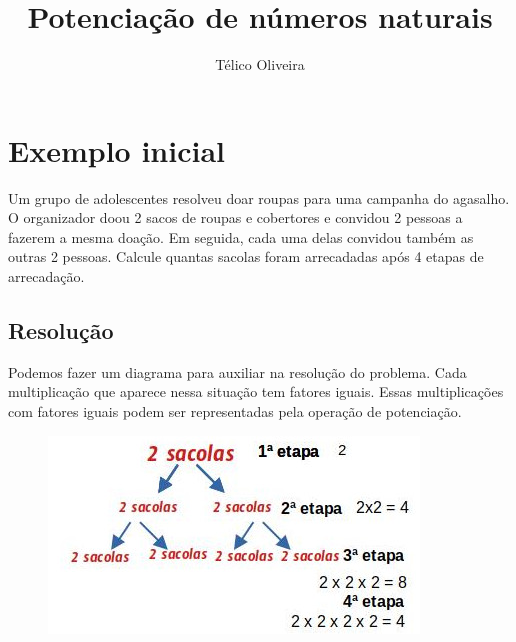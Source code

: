 \documentclass{article}
\title{Potenciação de números naturais}
\author{Télico Oliveira}
\begin{document}
\maketitle
\section{Exemplo inicial}
Um grupo de adolescentes resolveu doar roupas para uma campanha do agasalho. O organizador doou 2 sacos de roupas e cobertores e convidou 2 pessoas a fazerem a mesma doação. Em seguida, cada uma delas convidou também as outras 2 pessoas. 
Calcule quantas sacolas foram arrecadadas após 4 etapas de arrecadação. 
\subsection{Resolução}
Podemos fazer um diagrama para auxiliar na resolução do problema. 
Cada multiplicação que aparece nessa situação tem fatores iguais. Essas multiplicações com fatores iguais podem ser representadas pela operação de potenciação. 
\begin{figure}[htbp]
    \centering
    \includegraphics[scale=0.8]{potenciacao1.jpg}
    
    \label{fig:my_label}
\end{figure}
\end{document}
